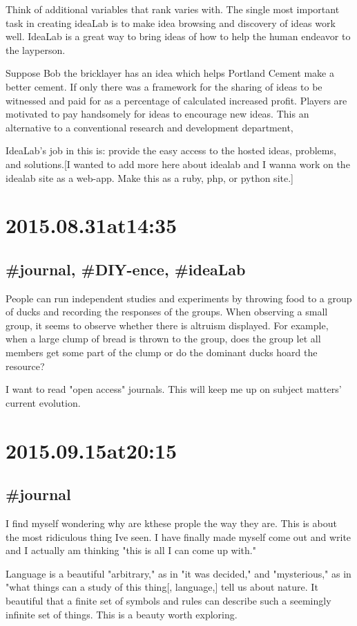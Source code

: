 Think of additional variables that rank varies with. The single most important task in creating ideaLab is to make idea browsing and discovery of ideas work well. IdeaLab is a great way to bring ideas of how to help the human endeavor to the layperson.

Suppose Bob the bricklayer has an idea which helps Portland Cement make a better cement. If only there was a framework for the sharing of ideas to be witnessed and paid for as a percentage of calculated increased profit. Players are motivated to pay handsomely for ideas to encourage new ideas. This an alternative to a conventional research and development department,

IdeaLab's job in this is:  provide the easy access to the hosted ideas, problems, and solutions.[I wanted to add more here about idealab and I wanna work on the idealab site as a web-app. Make this as a ruby, php, or python site.]

\section*{2015.08.31at14:35}
\subsection*{\#journal, \#DIY-ence, \#ideaLab}
People can run independent studies and experiments by throwing food to a group of ducks and recording the responses of the groups. When observing a small group, it seems to observe whether there is altruism displayed. For example, when a large clump of bread is thrown to the group, does the group let all members get some part of the clump or do the dominant ducks hoard the resource?

I want to read "open access" journals. This will keep me up on subject matters' current evolution.

\section*{2015.09.15at20:15}
\subsection*{\#journal}
I find myself wondering why are kthese prople the way they are. This is about the most ridiculous thing Ive seen. I have finally made myself come out and write and I actually am thinking "this is all I can come up with."

Language is a beautiful "arbitrary," as in "it was decided," and "mysterious," as in "what things can a study of this thing[, language,] tell us about nature. It beautiful that a finite set of symbols and rules can describe such a seemingly infinite set of things. This is a beauty worth exploring.

